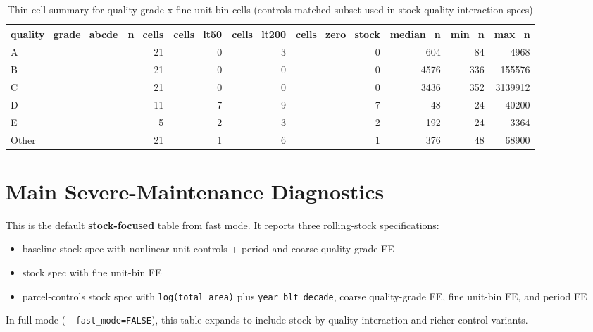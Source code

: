\documentclass[
  11pt,
]{article}
\providecommand{\tightlist}{%
  \setlength{\itemsep}{0pt}\setlength{\parskip}{0pt}}
\begin{document}
\begingroup\fontsize{8}{10}\selectfont

\begin{longtable}[t]{lrrrrrrr}
\caption{\label{tab:support-thin-cells}Thin-cell summary for quality-grade x fine-unit-bin cells (controls-matched subset used in stock-quality interaction specs)}\\
\toprule
quality\_grade\_abcde & n\_cells & cells\_lt50 & cells\_lt200 & cells\_zero\_stock & median\_n & min\_n & max\_n\\
\midrule
A & 21 & 0 & 3 & 0 & 604 & 84 & 4968\\
B & 21 & 0 & 0 & 0 & 4576 & 336 & 155576\\
C & 21 & 0 & 0 & 0 & 3436 & 352 & 3139912\\
D & 11 & 7 & 9 & 7 & 48 & 24 & 40200\\
E & 5 & 2 & 3 & 2 & 192 & 24 & 3364\\
\addlinespace
Other & 21 & 1 & 6 & 1 & 376 & 48 & 68900\\
\bottomrule
\end{longtable}
\endgroup{}

\section{Main Severe-Maintenance
Diagnostics}\label{main-severe-maintenance-diagnostics}

This is the default \textbf{stock-focused} table from fast mode. It
reports three rolling-stock specifications:

\begin{itemize}
\tightlist
\item
  baseline stock spec with nonlinear unit controls + period and coarse
  quality-grade FE
\item
  stock spec with fine unit-bin FE
\item
  parcel-controls stock spec with \texttt{log(total\_area)} plus
  \texttt{year\_blt\_decade}, coarse quality-grade FE, fine unit-bin FE,
  and period FE
\end{itemize}

In full mode (\texttt{-\/-fast\_mode=FALSE}), this table expands to
include stock-by-quality interaction and richer-control variants.
\end{document}
